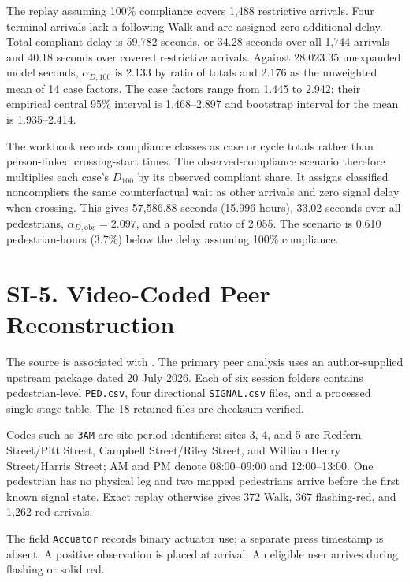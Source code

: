 \documentclass[11pt]{article}
\begin{document}
The replay assuming 100\% compliance covers 1,488 restrictive arrivals. Four terminal arrivals lack a following Walk and are assigned zero additional delay. Total compliant delay is 59,782 seconds, or 34.28 seconds over all 1,744 arrivals and 40.18 seconds over covered restrictive arrivals. Against 28,023.35 unexpanded model seconds, \(\alpha_{D,100}\) is 2.133 by ratio of totals and 2.176 as the unweighted mean of 14 case factors. The case factors range from 1.445 to 2.942; their empirical central 95\% interval is 1.468--2.897 and bootstrap interval for the mean is 1.935--2.414.

The workbook records compliance classes as case or cycle totals rather than person-linked crossing-start times. The observed-compliance scenario therefore multiplies each case's \(D_{100}\) by its observed compliant share. It assigns classified noncompliers the same counterfactual wait as other arrivals and zero signal delay when crossing. This gives 57,586.88 seconds (15.996 hours), 33.02 seconds over all pedestrians, \(\overline\alpha_{D,\mathrm{obs}}=2.097\), and a pooled ratio of 2.055. The scenario is 0.610 pedestrian-hours (3.7\%) below the delay assuming 100\% compliance.

\section*{SI-5. Video-Coded Peer Reconstruction}

The source is associated with \citet{choy2026pedestrianNonCompliance}. The primary peer analysis uses an author-supplied upstream package dated 20 July 2026. Each of six session folders contains pedestrian-level \texttt{PED.csv}, four directional \texttt{SIGNAL.csv} files, and a processed single-stage table. The 18 retained files are checksum-verified.

Codes such as \texttt{3AM} are site-period identifiers: sites 3, 4, and 5 are Redfern Street/Pitt Street, Campbell Street/Riley Street, and William Henry Street/Harris Street; AM and PM denote 08:00--09:00 and 12:00--13:00. One pedestrian has no physical leg and two mapped pedestrians arrive before the first known signal state. Exact replay otherwise gives 372 Walk, 367 flashing-red, and 1,262 red arrivals.

The field \texttt{Accuator} records binary actuator use; a separate press timestamp is absent. A positive observation is placed at arrival. An eligible user arrives during flashing or solid red.
\end{document}
